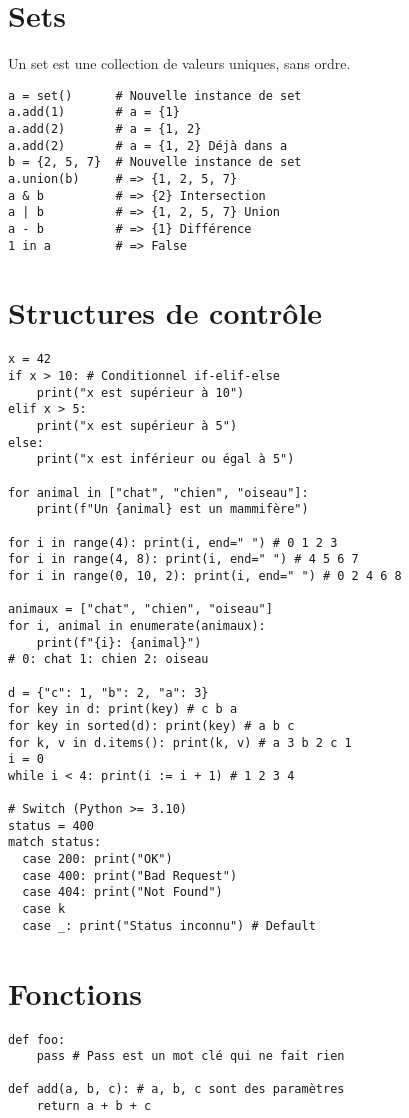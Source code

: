\documentclass{article}
\begin{document}
\begin{multicols*}{4}
\section*{Sets}
Un set est une collection de valeurs uniques, sans ordre.
\begin{lstlisting}
a = set()      # Nouvelle instance de set
a.add(1)       # a = {1}
a.add(2)       # a = {1, 2}
a.add(2)       # a = {1, 2} Déjà dans a
b = {2, 5, 7}  # Nouvelle instance de set
a.union(b)     # => {1, 2, 5, 7}
a & b          # => {2} Intersection
a | b          # => {1, 2, 5, 7} Union
a - b          # => {1} Différence
1 in a         # => False
\end{lstlisting}

\section*{Structures de contrôle}
\begin{lstlisting}
x = 42
if x > 10: # Conditionnel if-elif-else
    print("x est supérieur à 10")
elif x > 5:
    print("x est supérieur à 5")
else:
    print("x est inférieur ou égal à 5")

for animal in ["chat", "chien", "oiseau"]:
    print(f"Un {animal} est un mammifère")

for i in range(4): print(i, end=" ") # 0 1 2 3
for i in range(4, 8): print(i, end=" ") # 4 5 6 7
for i in range(0, 10, 2): print(i, end=" ") # 0 2 4 6 8

animaux = ["chat", "chien", "oiseau"]
for i, animal in enumerate(animaux):
    print(f"{i}: {animal}")
# 0: chat 1: chien 2: oiseau

d = {"c": 1, "b": 2, "a": 3}
for key in d: print(key) # c b a
for key in sorted(d): print(key) # a b c
for k, v in d.items(): print(k, v) # a 3 b 2 c 1
i = 0
while i < 4: print(i := i + 1) # 1 2 3 4
  
# Switch (Python >= 3.10)
status = 400
match status:
  case 200: print("OK")
  case 400: print("Bad Request")  
  case 404: print("Not Found")
  case k 
  case _: print("Status inconnu") # Default      
\end{lstlisting}

\section*{Fonctions}
\begin{lstlisting}
def foo: 
    pass # Pass est un mot clé qui ne fait rien

def add(a, b, c): # a, b, c sont des paramètres
    return a + b + c


\end{lstlisting}
\end{multicols*}
\end{document}
